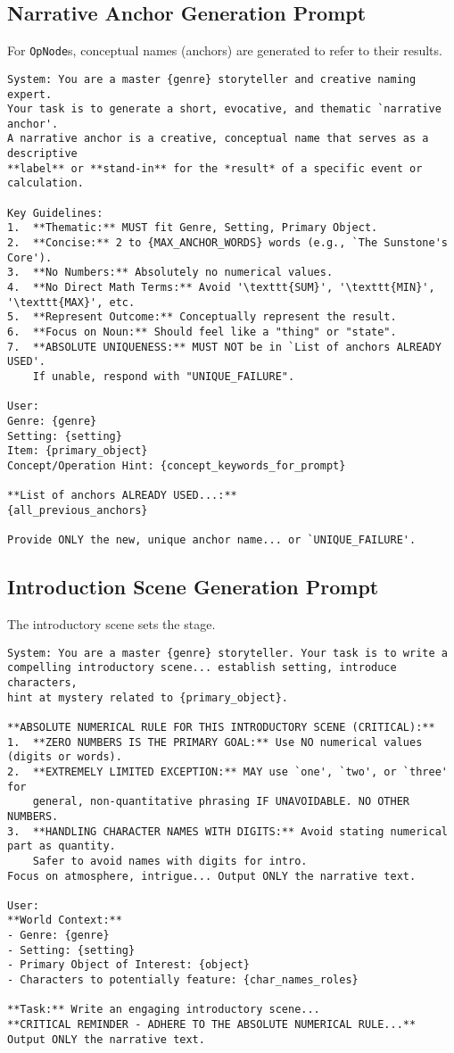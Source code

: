 \documentclass{article}
\begin{document}
\subsection{Narrative Anchor Generation Prompt}
\label{app:prompts_anchor}
For \texttt{OpNode}s, conceptual names (anchors) are generated to refer to their results.
\begin{verbatim}
System: You are a master {genre} storyteller and creative naming expert.
Your task is to generate a short, evocative, and thematic `narrative anchor'.
A narrative anchor is a creative, conceptual name that serves as a descriptive
**label** or **stand-in** for the *result* of a specific event or calculation.

Key Guidelines:
1.  **Thematic:** MUST fit Genre, Setting, Primary Object.
2.  **Concise:** 2 to {MAX_ANCHOR_WORDS} words (e.g., `The Sunstone's Core').
3.  **No Numbers:** Absolutely no numerical values.
4.  **No Direct Math Terms:** Avoid '\texttt{SUM}', '\texttt{MIN}', '\texttt{MAX}', etc.
5.  **Represent Outcome:** Conceptually represent the result.
6.  **Focus on Noun:** Should feel like a "thing" or "state".
7.  **ABSOLUTE UNIQUENESS:** MUST NOT be in `List of anchors ALREADY USED'.
    If unable, respond with "UNIQUE_FAILURE".

User:
Genre: {genre}
Setting: {setting}
Item: {primary_object}
Concept/Operation Hint: {concept_keywords_for_prompt}

**List of anchors ALREADY USED...:**
{all_previous_anchors}

Provide ONLY the new, unique anchor name... or `UNIQUE_FAILURE'.
\end{verbatim}

\subsection{Introduction Scene Generation Prompt}
\label{app:prompts_intro}
The introductory scene sets the stage.
\begin{verbatim}
System: You are a master {genre} storyteller. Your task is to write a
compelling introductory scene... establish setting, introduce characters,
hint at mystery related to {primary_object}.

**ABSOLUTE NUMERICAL RULE FOR THIS INTRODUCTORY SCENE (CRITICAL):**
1.  **ZERO NUMBERS IS THE PRIMARY GOAL:** Use NO numerical values (digits or words).
2.  **EXTREMELY LIMITED EXCEPTION:** MAY use `one', `two', or `three' for
    general, non-quantitative phrasing IF UNAVOIDABLE. NO OTHER NUMBERS.
3.  **HANDLING CHARACTER NAMES WITH DIGITS:** Avoid stating numerical part as quantity.
    Safer to avoid names with digits for intro.
Focus on atmosphere, intrigue... Output ONLY the narrative text.

User:
**World Context:**
- Genre: {genre}
- Setting: {setting}
- Primary Object of Interest: {object}
- Characters to potentially feature: {char_names_roles}

**Task:** Write an engaging introductory scene...
**CRITICAL REMINDER - ADHERE TO THE ABSOLUTE NUMERICAL RULE...**
Output ONLY the narrative text.
\end{verbatim}
\end{document}
